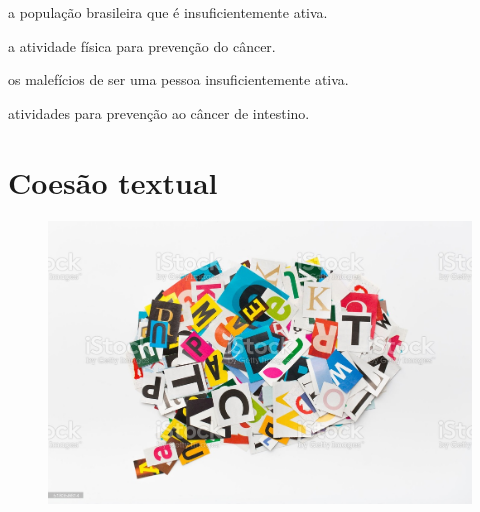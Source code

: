 \begin{escolha}
\item a população brasileira que é insuficientemente ativa.

\item a atividade física para prevenção do câncer.

\item os malefícios de ser uma pessoa insuficientemente ativa.

\item atividades para prevenção ao câncer de intestino.
\end{escolha}

\chapter{Coesão textual}


\begin{figure}[htpb!]
\includegraphics[width=\textwidth]{media/image35.jpeg}
\end{figure}

